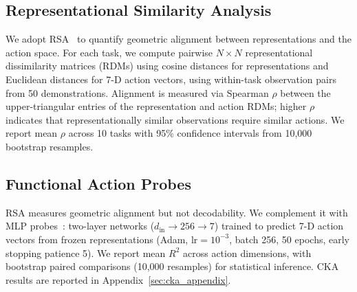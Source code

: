 \subsection{Representational Similarity Analysis}
\label{sec:rsa}

We adopt RSA~\cite{kriegeskorte2008} to quantify geometric alignment between representations and the action space.
For each task, we compute pairwise $N \times N$ representational dissimilarity matrices (RDMs) using cosine distances for representations and Euclidean distances for 7-D action vectors, using within-task observation pairs from 50 demonstrations.
Alignment is measured via Spearman $\rho$ between the upper-triangular entries of the representation and action RDMs; higher $\rho$ indicates that representationally similar observations require similar actions.
We report mean $\rho$ across 10 tasks with 95\% confidence intervals from 10{,}000 bootstrap resamples.

\subsection{Functional Action Probes}
\label{sec:probes}

RSA measures geometric alignment but not decodability.
We complement it with MLP probes~\cite{alain2017}: two-layer networks ($d_\text{in} \to 256 \to 7$) trained to predict 7-D action vectors from frozen representations (Adam, lr${}=10^{-3}$, batch 256, 50 epochs, early stopping patience 5).
We report mean $R^2$ across action dimensions, with bootstrap paired comparisons (10{,}000 resamples) for statistical inference.
CKA~\cite{kornblith2019} results are reported in Appendix~\ref{sec:cka_appendix}.
